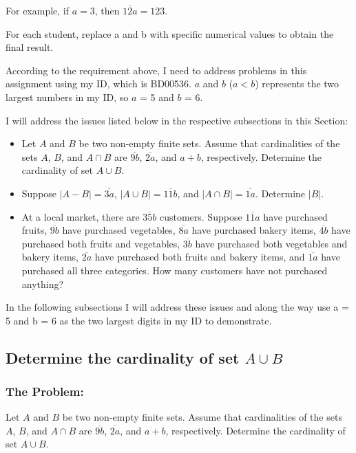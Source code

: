 \documentclass[12pt, a4paper, twoside]{report} %
\begin{document}
For example, if $a=3$, then $\overline{12a} = 123$.

For each student, replace a and b with specific numerical values to obtain the final result.

According to the requirement above, I need to address problems in this assignment using my ID, which is BD00536. $a$ and $b$ ($a < b$) represents the two largest numbers in my ID, so $a$ = 5 and $b$ = 6.

I will address the issues listed below in the respective subsections in this Section:

\begin{itemize}
  \item Let $A$ and $B$ be two non-empty finite sets. Assume that cardinalities of the sets $A$, $B$, and $A \cap B$ are $\overline{9b}$, $\overline{2a}$, and $a + b$, respectively. Determine the cardinality of set $A \cup B$.
  \item Suppose $|A-B|=\overline{3a}$, $|A \cup B|=\overline {11b}$, and $|A \cap B|=\overline{1a}$. Determine $|B|$.
  \item At a local market, there are $\overline {35b}$ customers. Suppose $\overline {11a}$ have purchased fruits, $\overline {9b}$ have purchased vegetables, $\overline {8a}$ have purchased bakery items, $\overline{4b}$ have purchased both fruits and vegetables, $\overline{3b}$ have purchased both vegetables and bakery items, $\overline{2a}$ have purchased both fruits and bakery items, and $\overline{1a}$ have purchased all three categories. How many customers have not purchased anything?
\end{itemize}

In the following subsections I will address these issues and along the way use a = 5 and b = 6 as the two largest digits in my ID to demonstrate.


\subsection{Determine the cardinality of set $A \cup B$}
\subsubsection*{The Problem:}

  Let $A$ and $B$ be two non-empty finite sets. Assume that cardinalities of the sets $A$, $B$, and $A \cap B$ are $\overline{9b}$, $\overline{2a}$, and $a + b$, respectively. Determine the cardinality of set $A \cup B$.
\end{document}
